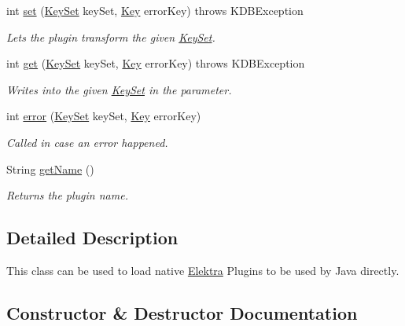 \begin{DoxyCompactItemize}
int \mbox{\hyperlink{classorg_1_1libelektra_1_1plugin_1_1NativePlugin_a9faeb1e6eb90a4c90681eeeb097eeb53}{set}} (\mbox{\hyperlink{classorg_1_1libelektra_1_1KeySet}{Key\+Set}} key\+Set, \mbox{\hyperlink{classorg_1_1libelektra_1_1Key}{Key}} error\+Key)  throws K\+D\+B\+Exception 	
\begin{DoxyCompactList}\small\item\em Lets the plugin transform the given \mbox{\hyperlink{classorg_1_1libelektra_1_1KeySet}{Key\+Set}}. \end{DoxyCompactList}\item 
int \mbox{\hyperlink{classorg_1_1libelektra_1_1plugin_1_1NativePlugin_a766870e5f26cab4d497ed7c2fbc4abd9}{get}} (\mbox{\hyperlink{classorg_1_1libelektra_1_1KeySet}{Key\+Set}} key\+Set, \mbox{\hyperlink{classorg_1_1libelektra_1_1Key}{Key}} error\+Key)  throws K\+D\+B\+Exception 	
\begin{DoxyCompactList}\small\item\em Writes into the given \mbox{\hyperlink{classorg_1_1libelektra_1_1KeySet}{Key\+Set}} in the parameter. \end{DoxyCompactList}\item 
int \mbox{\hyperlink{classorg_1_1libelektra_1_1plugin_1_1NativePlugin_a54c2753b1d17e14be39526a6ff02e34d}{error}} (\mbox{\hyperlink{classorg_1_1libelektra_1_1KeySet}{Key\+Set}} key\+Set, \mbox{\hyperlink{classorg_1_1libelektra_1_1Key}{Key}} error\+Key)
\begin{DoxyCompactList}\small\item\em Called in case an error happened. \end{DoxyCompactList}\item 
String \mbox{\hyperlink{classorg_1_1libelektra_1_1plugin_1_1NativePlugin_a606fc8f54bc810d874176103859976ab}{get\+Name}} ()
\begin{DoxyCompactList}\small\item\em Returns the plugin name. \end{DoxyCompactList}\end{DoxyCompactItemize}


\subsection{Detailed Description}
This class can be used to load native \mbox{\hyperlink{interfaceorg_1_1libelektra_1_1Elektra}{Elektra}} Plugins to be used by Java directly. 

\subsection{Constructor \& Destructor Documentation}
\mbox{\label{classorg_1_1libelektra_1_1plugin_1_1NativePlugin_ad228084d20bd57c561e49ee755e9c751}} 
